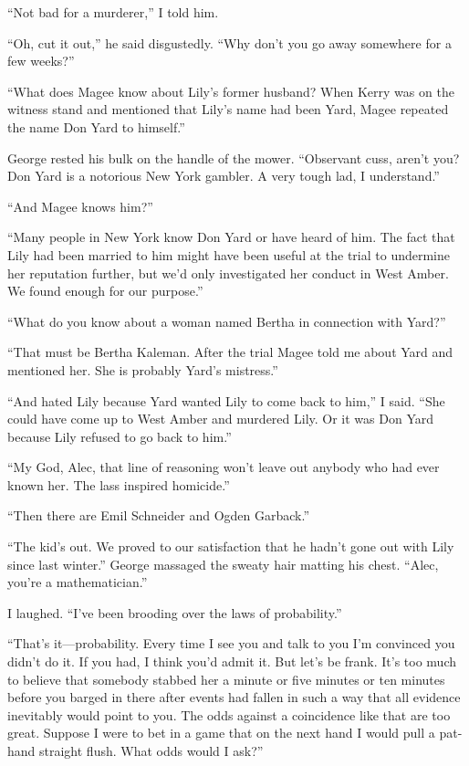 {“Not bad for a murderer,” I told him.

“Oh, cut it out,” he said disgustedly. “Why don’t you go away somewhere for a few weeks?”

“What does Magee know about Lily’s former husband? When Kerry was on the witness stand and mentioned that Lily’s name had been Yard, Magee repeated the name Don Yard to himself.”

George rested his bulk on the handle of the mower. “Observant cuss, aren’t you? Don Yard is a notorious New York gambler. A very tough lad, I understand.”

“And Magee knows him?”

“Many people in New York know Don Yard or have heard of him. The fact that Lily had been married to him might have been useful at the trial to undermine her reputation further, but we’d only investigated her conduct in West Amber. We found enough for our purpose.”

“What do you know about a woman named Bertha in connection with Yard?”

“That must be Bertha Kaleman. After the trial Magee told me about Yard and mentioned her. She is probably Yard’s mistress.”

“And hated Lily because Yard wanted Lily to come back to him,” I said. “She could have come up to West Amber and murdered Lily. Or it was Don Yard because Lily refused to go back to him.”

“My God, Alec, that line of reasoning won’t leave out anybody who had ever known her. The lass inspired homicide.”

“Then there are Emil Schneider and Ogden Garback.”

“The kid’s out. We proved to our satisfaction that he hadn’t gone out with Lily since last winter.” George massaged the sweaty hair matting his chest. “Alec, you’re a mathematician.”

I laughed. “I’ve been brooding over the laws of probability.”

“That’s it—probability. Every time I see you and talk to you I’m convinced you didn’t do it. If you had, I think you’d admit it. But let’s be frank. It’s too much to believe that somebody stabbed her a minute or five minutes or ten minutes before you barged in there after events had fallen in such a way that all evidence inevitably would point to you. The odds against a coincidence like that are too great. Suppose I were to bet in a game that on the next hand I would pull a pat-hand straight flush. What odds would I ask?”

}
